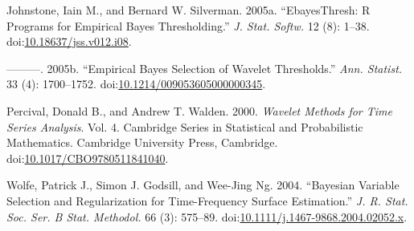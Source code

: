 \documentclass[]{tufte-handout}
\begin{document}
\hypertarget{ref-JS05}{}
Johnstone, Iain M., and Bernard W. Silverman. 2005a. ``EbayesThresh: R
Programs for Empirical Bayes Thresholding.'' \emph{J. Stat. Softw.} 12
(8): 1--38.
doi:\href{https://doi.org/10.18637/jss.v012.i08}{10.18637/jss.v012.i08}.

\hypertarget{ref-johnstone05}{}
---------. 2005b. ``Empirical Bayes Selection of Wavelet Thresholds.''
\emph{Ann. Statist.} 33 (4): 1700--1752.
doi:\href{https://doi.org/10.1214/009053605000000345}{10.1214/009053605000000345}.

\hypertarget{ref-percival00}{}
Percival, Donald B., and Andrew T. Walden. 2000. \emph{Wavelet Methods
for Time Series Analysis}. Vol. 4. Cambridge Series in Statistical and
Probabilistic Mathematics. Cambridge University Press, Cambridge.
doi:\href{https://doi.org/10.1017/CBO9780511841040}{10.1017/CBO9780511841040}.

\hypertarget{ref-wolfe04}{}
Wolfe, Patrick J., Simon J. Godsill, and Wee-Jing Ng. 2004. ``Bayesian
Variable Selection and Regularization for Time-Frequency Surface
Estimation.'' \emph{J. R. Stat. Soc. Ser. B Stat. Methodol.} 66 (3):
575--89.
doi:\href{https://doi.org/10.1111/j.1467-9868.2004.02052.x}{10.1111/j.1467-9868.2004.02052.x}.
\end{document}
